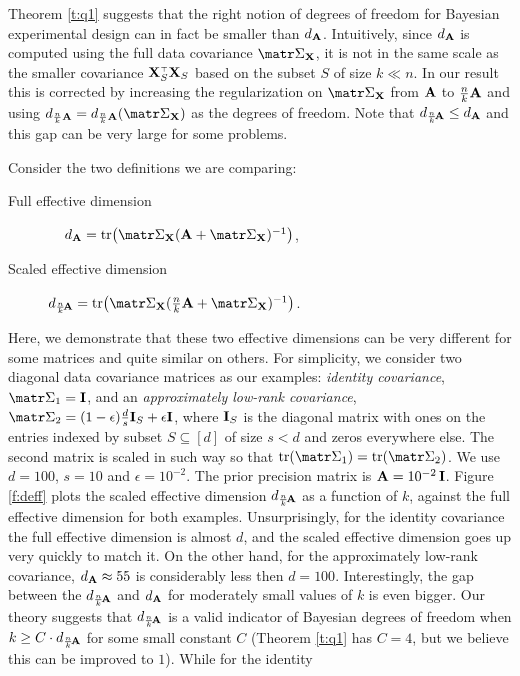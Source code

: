 \documentclass[../../thesis.tex]{subfiles}
\begin{document}
Theorem \ref{t:q1} suggests that the right notion of degrees of
freedom for Bayesian experimental design can in fact be smaller
than $d_{\mathbf A}$.
Intuitively, since $d_{\mathbf A}$ is computed using the full data covariance
$\Sigmab_{\X}$, it is not in the same scale as the smaller covariance
$\X_S^\top\X_S$ based on the subset $S$ of size $k\ll n$. In our
result this is corrected by increasing the
regularization on $\Sigmab_\X$ from $\mathbf A$ to $\frac{n}{k}\mathbf A$ and using
$d_{\frac nk\A}=d_{\frac{n}{k}\A}(\Sigmab_\X)$ as the degrees of
freedom.
Note that $d_{\frac nk\!\mathbf A}\leq d_{\mathbf A}$ and this gap can be very large for some
problems.


Consider the two definitions we are comparing:
\begin{description}
  \item[Full effective dimension]\quad\ \ \,$d_{\A} =
    \tr\big(\Sigmab_\X(\A+\Sigmab_\X)^{-1}\big)$,
  \item[Scaled effective dimension] $d_{\frac nk\!\A} =
      \tr\big(\Sigmab_\X(\tfrac nk\A + \Sigmab_\X)^{-1}\big)$.
\end{description}
Here, we demonstrate that these two effective dimensions can be
very different for some matrices and quite similar on others. For
simplicity, we consider two diagonal data covariance matrices as
our examples: \emph{identity covariance}, $\Sigmab_1 = \I$, and an
\emph{approximately low-rank covariance}, $\Sigmab_2 =
  (1-\epsilon)\frac ds \I_S+\epsilon\I$, where $\mathbf I_S$ is the
diagonal matrix with ones on the entries indexed by subset
$S\subseteq [d]$ of
size $s<d$ and zeros
everywhere else. The second matrix is scaled in such way so that
$\tr(\Sigmab_1)=\tr(\Sigmab_2)$. We use $d=100$, $s=10$ and
$\epsilon=10^{-2}$. The prior precision matrix is
$\mathbf A=10^{-2}\,\mathbf I$. Figure \ref{f:deff} plots the scaled effective
dimension $d_{\frac nk\!\mathbf A}$ as a function of $k$, against the
full effective dimension for both examples. Unsurprisingly, for
the identity covariance the full effective dimension is almost
$d$, and the scaled effective dimension goes up very quickly to
match it. On the other hand, for the approximately low-rank
covariance, $d_{\mathbf A}\approx 55$ is considerably less then
$d=100$. Interestingly, the gap between the $d_{\frac nk\!\mathbf A}$ and
$d_{\mathbf A}$ for moderately small values of $k$ is even bigger. Our
theory suggests that $d_{\frac nk\!\mathbf A}$ is a valid indicator of
Bayesian degrees of freedom when $k\geq C\cdot d_{\frac nk\!\mathbf A}$
for some small constant $C$ (Theorem \ref{t:q1} has $C=4$, but we
believe this can be improved to $1$). While for the identity
\end{document}

